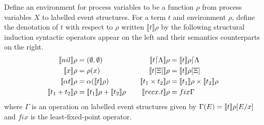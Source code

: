 \documentclass{article}
\begin{document}
\begin{definition}
    Define an environment for process variables to be a function $\rho$
    from process variables $X$ to labelled event structures.
    For a term $t$ and environment $\rho$, define the denotation of $t$ with
    respect to $\rho$ written $\llbracket t \rrbracket \rho$ by the following
    structural induction syntactic operators appear on the left and their
    semantics counterparts on the right.
    \begin{equation*}
        \begin{aligned}[c]
            \llbracket nil \rrbracket\rho       & = (\emptyset,\emptyset)         \\
            \llbracket x \rrbracket\rho         & = \rho(x)                       \\
            \llbracket \alpha t \rrbracket\rho  & = \alpha(\llbracket t \rrbracket\rho)           \\
            \llbracket t_1 + t_2 \rrbracket\rho & = \llbracket t_1 \rrbracket\rho + \llbracket t_2 \rrbracket\rho \\
        \end{aligned}
        \qquad
        \begin{aligned}[c]
            \llbracket t\lceil \Lambda \rrbracket\rho & = \llbracket t \rrbracket\rho \lceil \Lambda         \\
            \llbracket t[\Xi] \rrbracket\rho          & = \llbracket t \rrbracket\rho[\Xi]                   \\
            \llbracket t_1 \times t_2 \rrbracket\rho  & = \llbracket t_1 \rrbracket\rho \times \llbracket t_2 \rrbracket\rho \\
            \llbracket recx.t \rrbracket\rho          & = fix\Gamma                          \\
        \end{aligned}
    \end{equation*}
    where $\Gamma$ is an operation on labelled event structures given by
    $\Gamma(E) = \llbracket t \rrbracket\rho[E / x]$ and $fix$ is the least-fixed-point operator.
\end{definition}
\end{document}
